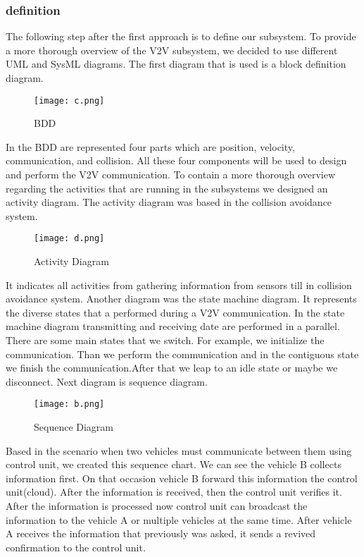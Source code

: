 \documentclass[conference]{IEEEtran}
\begin{document}
\subsubsection{definition}
The following step after the first approach is to define our subsystem. To provide a more thorough overview of the V2V subsystem, we decided to use different UML and SysML diagrams. The first diagram that is used is a block definition diagram. 
\begin{figure}[htp]
    \centering
    \texttt{[image: c.png]}
    \caption{BDD}
    \label{fig:reg-gen}
\end{figure}
In the BDD are represented four parts which are position, velocity, communication, and collision. All these four components will be used to design and perform the V2V communication. To contain a more thorough overview regarding the activities that are running in the subsystems we designed an activity diagram. The activity diagram was based in the collision avoidance system.
\begin{figure}[htp]
    \centering
     \texttt{[image: d.png]}
    \caption{Activity Diagram}
    \label{fig:reg-gen}
\end{figure}
It indicates all activities from gathering information from sensors till in collision avoidance system. Another diagram was the state machine diagram. It represents the diverse states that a performed during a V2V communication. In the state machine diagram transmitting and receiving date are performed in a parallel. There are some main states that we switch. For example, we initialize the communication. Than we perform the communication and in the contiguous state we finish the communication.After that we leap to an idle state or maybe we disconnect. Next diagram is sequence diagram.
\begin{figure}[htp]
    \centering
     \texttt{[image: b.png]}
    \caption{Sequence Diagram}
    \label{fig:reg-gen}
\end{figure}
Based in the scenario when two vehicles must communicate between them using control unit, we created this sequence chart. We can see the vehicle B collects information first. On that occasion vehicle B forward this information the control unit(cloud). After the information is received, then the control unit verifies it. After the information is processed now control unit can broadcast the information to the vehicle A or multiple vehicles at the same time. After vehicle A receives the information that previously was asked, it sends a revived confirmation to the control unit.
\end{document}
